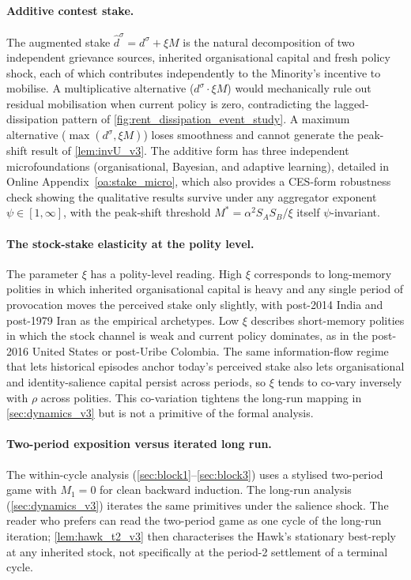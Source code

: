 \documentclass[11pt,twoside]{extarticle}
\begin{document}
\paragraph{Additive contest stake.} The augmented stake $\hat d^\sigma=d^\sigma+\xi M$ is the natural decomposition of two independent grievance sources, inherited organisational capital and fresh policy shock, each of which contributes independently to the Minority's incentive to mobilise. A multiplicative alternative ($d^\sigma\cdot\xi M$) would mechanically rule out residual mobilisation when current policy is zero, contradicting the lagged-dissipation pattern of \autoref{fig:rent_dissipation_event_study}. A maximum alternative ($\max(d^\sigma,\xi M)$) loses smoothness and cannot generate the peak-shift result of \autoref{lem:invU_v3}. The additive form has three independent microfoundations (organisational, Bayesian, and adaptive learning), detailed in Online Appendix~\ref{oa:stake_micro}, which also provides a CES-form robustness check showing the qualitative results survive under any aggregator exponent $\psi\in[1,\infty]$, with the peak-shift threshold $M^*=\alpha^2 S_AS_B/\xi$ itself $\psi$-invariant.

\paragraph{The stock-stake elasticity at the polity level.} The parameter $\xi$ has a polity-level reading. High $\xi$ corresponds to long-memory polities in which inherited organisational capital is heavy and any single period of provocation moves the perceived stake only slightly, with post-2014 India and post-1979 Iran as the empirical archetypes. Low $\xi$ describes short-memory polities in which the stock channel is weak and current policy dominates, as in the post-2016 United States or post-Uribe Colombia. The same information-flow regime that lets historical episodes anchor today's perceived stake also lets organisational and identity-salience capital persist across periods, so $\xi$ tends to co-vary inversely with $\rho$ across polities. This co-variation tightens the long-run mapping in \autoref{sec:dynamics_v3} but is not a primitive of the formal analysis.

\paragraph{Two-period exposition versus iterated long run.} The within-cycle analysis (\autoref{sec:block1}--\autoref{sec:block3}) uses a stylised two-period game with $M_1=0$ for clean backward induction. The long-run analysis (\autoref{sec:dynamics_v3}) iterates the same primitives under the salience shock. The reader who prefers can read the two-period game as one cycle of the long-run iteration; \autoref{lem:hawk_t2_v3} then characterises the Hawk's stationary best-reply at any inherited stock, not specifically at the period-2 settlement of a terminal cycle.
\end{document}
